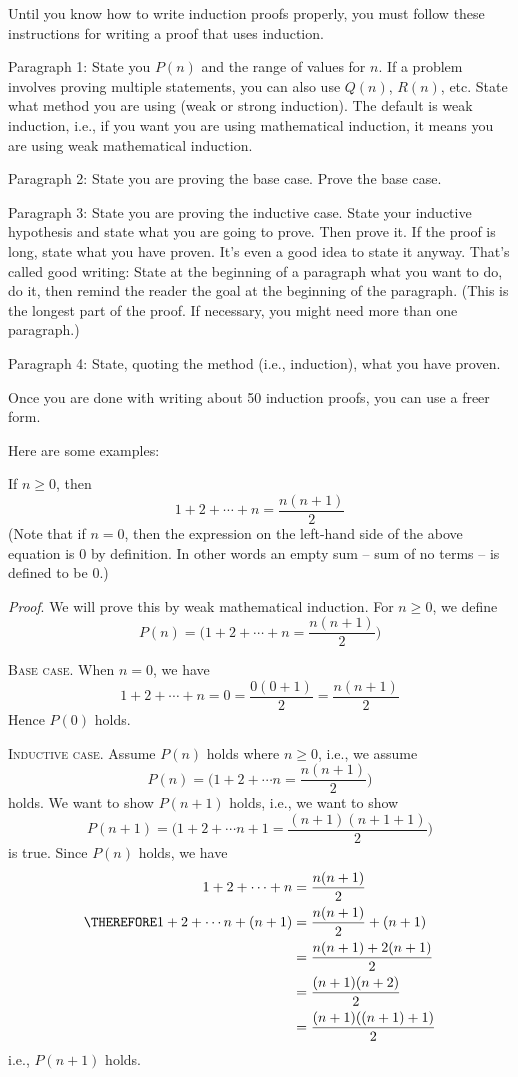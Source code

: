 Until you know how to write induction proofs properly, you must follow these
instructions for writing a proof that uses induction.
\begin{tightlist}
\item[1.]
  Paragraph 1: State you $P(n)$ and the range of values for $n$.
  If a problem involves proving multiple statements, you can also use
  $Q(n)$, $R(n)$, etc.
  State what method you are using (weak or strong induction).
  The default is weak induction, i.e., if you want you are using
  mathematical induction, it means you are using weak mathematical induction.
\item [2.]
  Paragraph 2: State you are proving the base case.
  Prove the base case.
\item [3.]
  Paragraph 3: State you are proving the inductive case.
  State your inductive hypothesis and state what you are going to prove.
  Then prove it. If the proof is long, state what you have proven.
  It's even a good idea to state it anyway. That's called good writing:
  State at the beginning of a paragraph what you want to do, do it, then
  remind the reader the goal at the beginning of the paragraph.
  (This is the longest part of the proof. If necessary, you might need
  more than one paragraph.)
\item [4.]
  Paragraph 4:
  State, quoting the method (i.e., induction), what you have proven.
\end{tightlist}
Once you are done with writing about 50 induction proofs, you can use a
freer form.

Here are some examples:

\newpage

\begin{thm}
  If $n \geq 0$, then
  \[
    1 + 2 + \cdots + n = \frac{n(n + 1)}{2}
  \]
  (Note that if $n = 0$, then the expression on the left-hand side of the above
  equation is 0 by definition.
  In other words an empty sum -- sum of no terms -- is defined to be 0.)
\end{thm}

\textit{Proof}.
We will prove this by weak mathematical induction.
For $n \geq 0$, we define
\[
  P(n) = \biggl( 1 + 2 + \cdots + n = \frac{n(n + 1)}{2} \biggr)
\]

\textsc{Base case.}
When $n = 0$, we have
\[
1 + 2 + \cdots + n = 0 = \frac{0(0 + 1)}{2} = \frac{n (n + 1)}{2}
\]
Hence $P(0)$ holds.

\textsc{Inductive case.}
Assume $P(n)$ holds where $n \geq 0$, i.e., we assume
\[
  P(n) = \biggl( 1 + 2 + \cdots n = \frac{n(n + 1)}{2} \biggr)
\]
holds.
We want to show $P(n + 1)$ holds, i.e., we want to show
\[
P(n + 1) =
\biggl(
1 + 2 + \cdots n + 1 = \frac{(n + 1)(n + 1 + 1)}{2}
\biggr)
\]
is true.
Since $P(n)$ holds, we have
\begin{align*}
  1 + 2 + \cdots + n
  &= \frac{n(n + 1)}{2} \\
  \THEREFORE 1 + 2 + \cdots n + (n + 1)
  &= \frac{n(n + 1)}{2} + (n + 1) \\
  &= \frac{n(n + 1) + 2(n + 1)}{2} \\
  &= \frac{(n + 1)(n + 2)}{2} \\
  &= \frac{(n + 1)((n + 1) + 1)}{2}
\end{align*}
i.e., $P(n + 1)$ holds.

